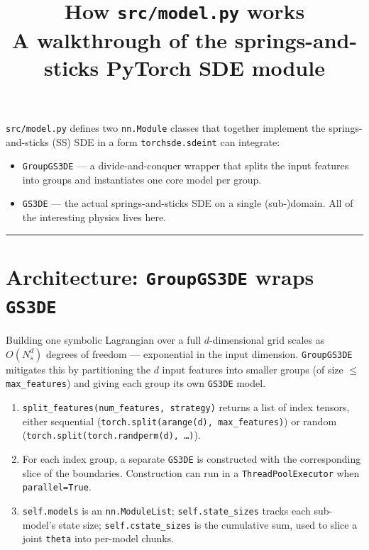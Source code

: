 \documentclass[11pt]{article}
\title{\textbf{How \texttt{src/model.py} works}\\
\large A walkthrough of the springs-and-sticks PyTorch SDE module}
\date{}
\author{}
\newcommand{\code}[1]{\texttt{\small #1}}
\begin{document}
\maketitle

\noindent\code{src/model.py} defines two \code{nn.Module} classes that together implement the springs-and-sticks (SS) SDE in a form \code{torchsde.sdeint} can integrate:
\begin{itemize}[leftmargin=*,itemsep=2pt]
  \item \code{GroupGS3DE} --- a divide-and-conquer wrapper that splits the input features into groups and instantiates one core model per group.
  \item \code{GS3DE} --- the actual springs-and-sticks SDE on a single (sub-)domain. All of the interesting physics lives here.
\end{itemize}

\tableofcontents
\bigskip\hrule\bigskip

\section{Architecture: \texttt{GroupGS3DE} wraps \texttt{GS3DE}}

Building one symbolic Lagrangian over a full $d$-dimensional grid scales as $O(N_s^d)$ degrees of freedom --- exponential in the input dimension. \code{GroupGS3DE} mitigates this by partitioning the $d$ input features into smaller groups (of size $\le$ \code{max\_features}) and giving each group its own \code{GS3DE} model.

\begin{enumerate}[leftmargin=*,itemsep=2pt]
  \item \code{split\_features(num\_features, strategy)} returns a list of index tensors, either sequential (\code{torch.split(arange(d), max\_features)}) or random (\code{torch.split(torch.randperm(d), \dots)}).
  \item For each index group, a separate \code{GS3DE} is constructed with the corresponding slice of the boundaries. Construction can run in a \code{ThreadPoolExecutor} when \code{parallel=True}.
  \item \code{self.models} is an \code{nn.ModuleList}; \code{self.state\_sizes} tracks each sub-model's state size; \code{self.cstate\_sizes} is the cumulative sum, used to slice a joint \code{theta} into per-model chunks.
\end{enumerate}
\end{document}
